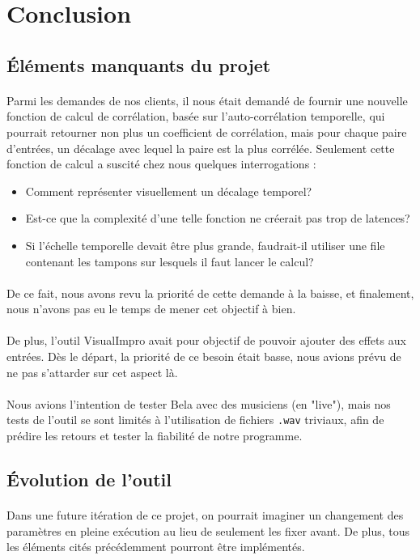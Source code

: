 \newpage
\section{Conclusion}
\subsection{Éléments manquants du projet}
\paragraph{}
Parmi les demandes de nos clients, il nous était demandé de fournir une nouvelle fonction de calcul de corrélation, basée sur l'auto-corrélation temporelle, qui pourrait retourner non plus un coefficient de corrélation, mais pour chaque paire d'entrées, un décalage avec lequel la paire est la plus corrélée. Seulement cette fonction de calcul a suscité chez nous quelques interrogations :
\begin{itemize}
    \item Comment représenter visuellement un décalage temporel?
    \item Est-ce que la complexité d'une telle fonction ne créerait pas trop de latences?
    \item Si l'échelle temporelle devait être plus grande, faudrait-il utiliser une file contenant les tampons sur lesquels il faut lancer le calcul?
\end{itemize}
\paragraph{}
De ce fait, nous avons revu la priorité de cette demande à la baisse, et finalement, nous n'avons pas eu le temps de mener cet objectif à bien.
\paragraph{}
De plus, l'outil VisualImpro avait pour objectif de pouvoir ajouter des effets aux entrées. Dès le départ, la priorité de ce besoin était basse, nous avions prévu de ne pas s'attarder sur cet aspect là.
\paragraph{}
Nous avions l'intention de tester Bela avec des musiciens (en "live"), mais nos tests de l'outil se sont limités à l'utilisation de fichiers \verb!.wav! triviaux, afin de prédire les retours et tester la fiabilité de notre programme.
\subsection{Évolution de l'outil}
\paragraph{}
Dans une future itération de ce projet, on pourrait imaginer un changement des paramètres en pleine exécution au lieu de seulement les fixer avant. De plus, tous les éléments cités précédemment pourront être implémentés.
